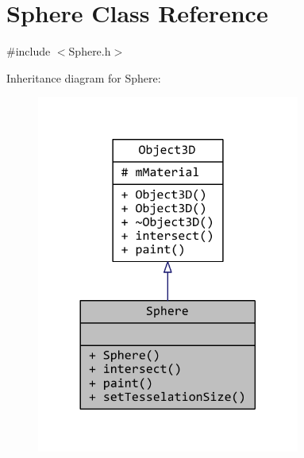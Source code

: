 \hypertarget{classSphere}{\section{Sphere Class Reference}
\label{classSphere}
}


{\ttfamily \#include $<$Sphere.\+h$>$}



Inheritance diagram for Sphere\+:
\nopagebreak
\begin{figure}[H]
\begin{center}
\leavevmode
\includegraphics[width=245pt]{classSphere__inherit__graph}
\end{center}
\end{figure}



